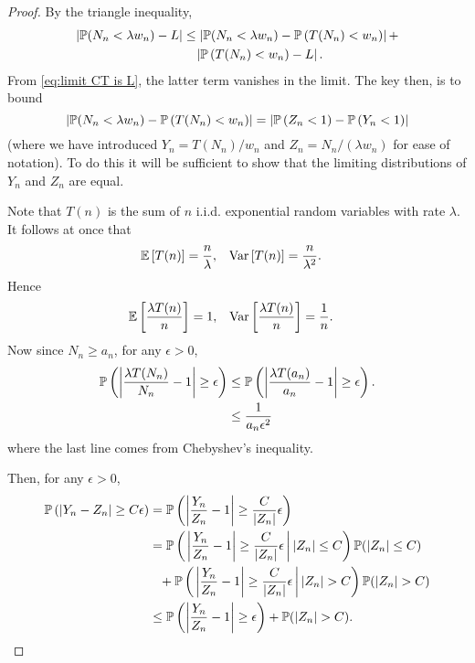 	\begin{proof}
		By the triangle inequality,
		\begin{align}
			|\mathbb{P}(N_n < \lambda w_n) - L| &\leq \left|\mathbb{P}(N_n < \lambda w_n) - \mathbb{P}\left(T(N_n) < w_n\right)\right| + \\
				&\phantom{\leq \,} \left|\mathbb{P}\left(T(N_n) < w_n\right) - L\right|. \notag
		\end{align}
		From \eqref{eq:limit CT is L}, the latter term vanishes in the limit. The key then, is to bound
		\begin{equation}
			\left|\mathbb{P}(N_n < \lambda w_n) - \mathbb{P}\left(T(N_n) < w_n\right)\right| = \left|\mathbb{P}\left(Z_n < 1\right) - \mathbb{P}\left(Y_n < 1\right)\right|
		\end{equation}
		(where we have introduced $Y_n = T(N_n)/w_n$ and $Z_n = N_n/(\lambda w_n)$ for ease of notation). To do this it will be sufficient to show that the limiting distributions of $Y_n$ and $Z_n$ are equal.

		Note that $T(n)$ is the sum of $n$ i.i.d. exponential random variables with rate $\lambda$. It follows at once that
		\begin{align}
			\mathbb{E}\left[T(n)\right] &= \frac{n}{\lambda},
			&\mathrm{Var}\left[T(n)\right] &= \frac{n}{\lambda^2}.
		\end{align}
		Hence
		\begin{align}
			\mathbb{E}\left[\frac{\lambda T(n)}{n}\right] &= 1,
			&\mathrm{Var}\left[\frac{\lambda T(n)}{n}\right] &= \frac{1}{n}.
		\end{align}
		Now since $N_n \geq a_n$, for any $\epsilon > 0$,
		\begin{align}
			\mathbb{P}\left(\left|\frac{\lambda T(N_n)}{N_n} - 1\right| \geq \epsilon\right) &\leq \mathbb{P}\left(\left|\frac{\lambda T(a_n)}{a_n} - 1\right| \geq \epsilon\right).\\
			&\leq \frac{1}{a_n \epsilon^2}
			\label{eq:Y_n/Z_n - 1 goes to 0}
		\end{align}
		where the last line comes from Chebyshev's inequality.

		Then, for any $\epsilon > 0$,
		\begin{align}
			\mathbb{P}\left(\left|Y_n - Z_n\right| \geq C \epsilon \right) &= \mathbb{P}\left(\left|\frac{Y_n}{Z_n} - 1\right| \geq \frac{C}{|Z_n|} \epsilon \right)\\
			&=  \mathbb{P}\left(\left. \left|\frac{Y_n}{Z_n} - 1\right| \geq \frac{C}{|Z_n|} \epsilon \, \right| |Z_n| \leq C \right) \mathbb{P}(|Z_n| \leq C) \notag \\
			&\phantom{=}+  \mathbb{P}\left(\left. \left|\frac{Y_n}{Z_n} - 1\right| \geq \frac{C}{|Z_n|} \epsilon \, \right| |Z_n| > C \right) \mathbb{P}(|Z_n| > C)\\
			&\leq \mathbb{P}\left(\left|\frac{Y_n}{Z_n} - 1\right| \geq \epsilon \right) + \mathbb{P}(|Z_n| > C).
		\end{align}


\end{proof}
